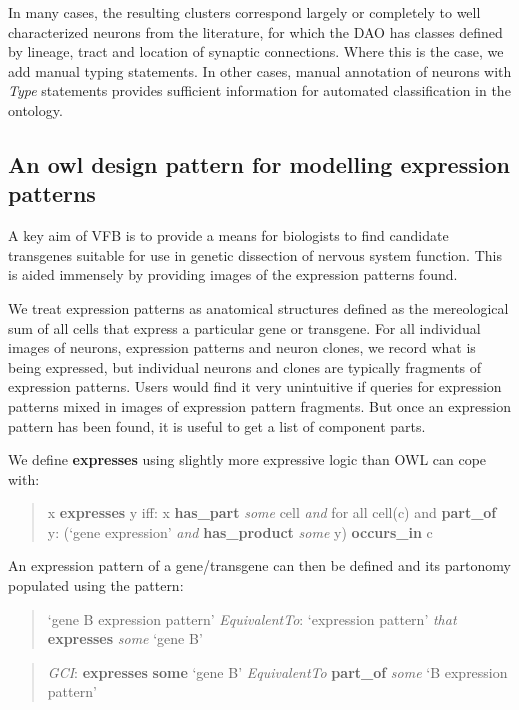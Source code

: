 \documentclass[runningheads,a4paper]{llncs}
\begin{document}
In many cases, the resulting clusters correspond largely or completely
to well characterized neurons from the literature, for which the DAO
has classes defined by lineage, tract and location of synaptic
connections. Where this is the case, we add manual typing
statements. In other cases, manual annotation of neurons with
\textit{Type} statements provides sufficient information for automated
classification in the ontology.

\subsection{An owl design pattern for modelling expression patterns}

A key aim of VFB is to provide a means for biologists to find
candidate transgenes suitable for use in genetic dissection of nervous
system function.  This is aided immensely by providing images of the
expression patterns found.

We treat expression patterns as anatomical structures defined as the
mereological sum of all cells that express a particular gene or
transgene. For all individual images of neurons, expression patterns
and neuron clones, we record what is being expressed, but individual
neurons and clones are typically fragments of expression patterns.
Users would find it very unintuitive if queries for expression
patterns mixed in images of expression pattern fragments.   But once
an expression pattern has been found, it is useful to get a list of
component parts.

We define \textbf{expresses} using slightly more expressive logic than OWL can
cope with:

\begin{quote} 
x \textbf{expresses} y iff:  x \textbf{has\_part} \textit{some} cell \textit{and}
for all cell(c) and \textbf{part\_of} y: (`gene expression' \textit{and} \textbf{has\_product} \textit{some} y) \textbf{occurs\_in} c
\end{quote}

An expression pattern of a gene/transgene can then be defined and its
partonomy populated using the pattern:

\begin{quote} 
`gene B expression pattern'
\textit{EquivalentTo}: `expression pattern' \textit{that} \textbf{expresses} \textit{some} `gene B'\end{quote}
\begin{quote} \textit{GCI}: \textbf{expresses} \textbf{some} `gene B' \textit{EquivalentTo} \textbf{part\_of} \textit{some} `B expression pattern'
\end{quote}
\end{document}
